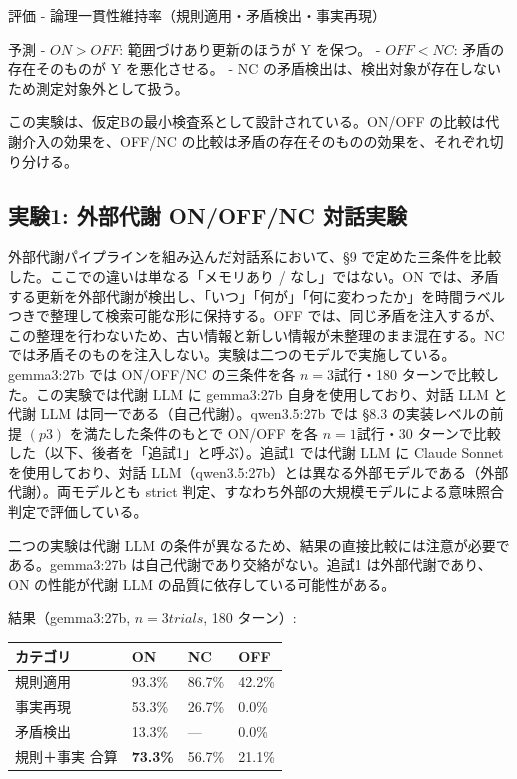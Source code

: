 \documentclass[12pt,a4paper]{article}
\begin{document}
評価 - 論理一貫性維持率（規則適用・矛盾検出・事実再現）

予測 - \(ON > OFF\): 範囲づけあり更新のほうが Y を保つ。 - \(OFF < NC\): 矛盾の存在そのものが Y を悪化させる。 - NC の矛盾検出は、検出対象が存在しないため測定対象外として扱う。

この実験は、仮定Bの最小検査系として設計されている。ON/OFF の比較は代謝介入の効果を、OFF/NC の比較は矛盾の存在そのものの効果を、それぞれ切り分ける。

\subsection{実験1: 外部代謝 ON/OFF/NC 対話実験}\label{ux5b9fux9a131-ux5916ux90e8ux4ee3ux8b1d-onoffnc-ux5bfeux8a71ux5b9fux9a13}

外部代謝パイプラインを組み込んだ対話系において、§9 で定めた三条件を比較した。ここでの違いは単なる「メモリあり / なし」ではない。ON では、矛盾する更新を外部代謝が検出し、「いつ」「何が」「何に変わったか」を時間ラベルつきで整理して検索可能な形に保持する。OFF では、同じ矛盾を注入するが、この整理を行わないため、古い情報と新しい情報が未整理のまま混在する。NC では矛盾そのものを注入しない。実験は二つのモデルで実施している。gemma3:27b では ON/OFF/NC の三条件を各 \(n=3\)試行・180 ターンで比較した。この実験では代謝 LLM に gemma3:27b 自身を使用しており、対話 LLM と代謝 LLM は同一である（自己代謝）。qwen3.5:27b では §8.3 の実装レベルの前提 \((p3)\) を満たした条件のもとで ON/OFF を各 \(n=1\)試行・30 ターンで比較した（以下、後者を「追試1」と呼ぶ）。追試1 では代謝 LLM に Claude Sonnet を使用しており、対話 LLM（qwen3.5:27b）とは異なる外部モデルである（外部代謝）。両モデルとも strict 判定、すなわち外部の大規模モデルによる意味照合判定で評価している。

二つの実験は代謝 LLM の条件が異なるため、結果の直接比較には注意が必要である。gemma3:27b は自己代謝であり交絡がない。追試1 は外部代謝であり、ON の性能が代謝 LLM の品質に依存している可能性がある。

結果（gemma3:27b, \(n=3 trials\), 180 ターン）:

{\def\LTcaptype{table} %
\begin{longtable}[]{@{}llll@{}}
\toprule\noalign{}
カテゴリ & ON & NC & OFF \\
\midrule\noalign{}
\endhead
\bottomrule\noalign{}
\endlastfoot
規則適用 & 93.3\% & 86.7\% & 42.2\% \\
事実再現 & 53.3\% & 26.7\% & 0.0\% \\
矛盾検出 & 13.3\% & --- & 0.0\% \\
規則＋事実 合算 & \textbf{73.3\%} & 56.7\% & 21.1\% \\
\end{longtable}
}
\end{document}
